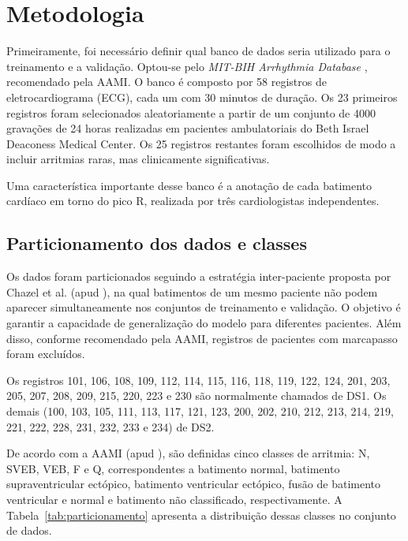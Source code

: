 \chapter{Metodologia}



Primeiramente, foi necessário definir qual banco de dados seria utilizado para o treinamento e a validação. Optou-se pelo \textit{MIT-BIH Arrhythmia Database} \cite{mitbih2005}, recomendado pela AAMI. O banco é composto por 58 registros de eletrocardiograma (ECG), cada um com 30 minutos de duração. Os 23 primeiros registros foram selecionados aleatoriamente a partir de um conjunto de 4000 gravações de 24 horas realizadas em pacientes ambulatoriais do Beth Israel Deaconess Medical Center. Os 25 registros restantes foram escolhidos de modo a incluir arritmias raras, mas clinicamente significativas.

Uma característica importante desse banco é a anotação de cada batimento cardíaco em torno do pico R, realizada por três cardiologistas independentes.

\section{Particionamento dos dados e classes}
\label{sec:particionamento}

Os dados foram particionados seguindo a estratégia inter-paciente proposta por Chazel et al. (apud ), na qual batimentos de um mesmo paciente não podem aparecer simultaneamente nos conjuntos de treinamento e validação. O objetivo é garantir a capacidade de generalização do modelo para diferentes pacientes. Além disso, conforme recomendado pela AAMI, registros de pacientes com marcapasso foram excluídos.  

Os registros 101, 106, 108, 109, 112, 114, 115, 116, 118, 119, 122, 124, 201, 203, 205, 207, 208, 209, 215, 220, 223 e 230 são normalmente chamados de DS1. Os demais (100, 103, 105, 111, 113, 117, 121, 123, 200, 202, 210, 212, 213, 214, 219, 221, 222, 228, 231, 232, 233 e 234) de DS2.

De acordo com a AAMI (apud ), são definidas cinco classes de arritmia: N, SVEB, VEB, F e Q, correspondentes a batimento normal, batimento supraventricular ectópico, batimento ventricular ectópico, fusão de batimento ventricular e normal e batimento não classificado, respectivamente. A Tabela~\ref{tab:particionamento} apresenta a distribuição dessas classes no conjunto de dados.

